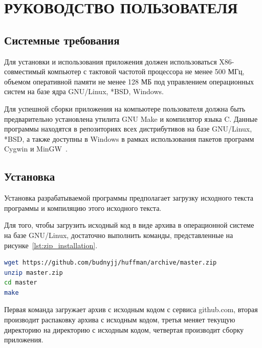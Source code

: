 \section[Руководство пользователя]{РУКОВОДСТВО ПОЛЬЗОВАТЕЛЯ}
\label{sec:user_manual}

\subsection{Системные требования}

Для установки и использования приложения должен использоваться 
X86-совместимый компьютер с тактовой частотой процессора не менее 500 МГц,
объемом оперативной памяти не менее 128 МБ под управлением операционных систем
на базе ядра GNU/Linux, *BSD, Windows.

Для успешной сборки приложения на компьютере пользователя должна быть
предварительно установлена утилита GNU Make и компилятор языка C.
Данные программы находятся в репозиториях всех дистрибутивов на базе GNU/Linux,
*BSD, а также доступны в Windows в рамках использования пакетов программ 
Cygwin и MinGW~\cite{cygwin, mingw}.

\subsection{Установка}

Установка разрабатываемой программы предполагает загрузку исходного текста
программы и компиляцию этого исходного текста.


Для того, чтобы загрузить исходный код в виде архива в операционной системе 
на базе GNU/Linux, достаточно выполнить
команды, представленные на рисунке~\ref{lst:zip_installation}.

\begin{lstlisting}[basicstyle=\scriptsize\ttfamily,
                   numberstyle=\scriptsize\ttfamily,
                   xleftmargin=7mm,
                   language=bash,
                   caption=Команды установки архиватора \\ 
                   без создания репозитория,
                   label=lst:zip_installation]
wget https://github.com/budnyjj/huffman/archive/master.zip
unzip master.zip
cd master
make
\end{lstlisting}

Первая команда загружает архив с исходным кодом с сервиса github.com,
вторая производит распаковку архива с исходным кодом,
третья меняет текущую директорию на директорию с исходным кодом,
четвертая производит сборку приложения.

